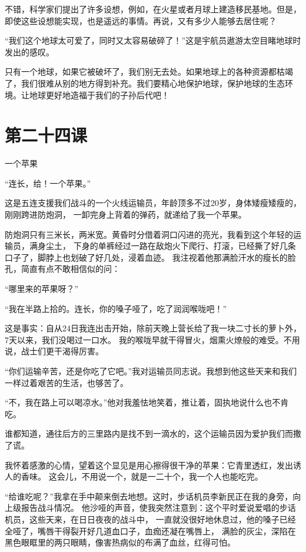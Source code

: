 \documentclass[12pt,UTF8]{ctexbook}
\begin{document}
不错，科学家们提出了许多设想，例如，在火星或者月球上建造移民基地。但是，即使这些设想能实现，也是遥远的事情。再说，又有多少人能够去居住呢？

“我们这个地球太可爱了，同时又太容易破碎了！”这是宇航员遨游太空目睹地球时发出的感叹。

只有一个地球，如果它被破坏了，我们别无去处。如果地球上的各种资源都枯竭了，我们很难从别的地方得到补充。我们要精心地保护地球，保护地球的生态环境。让地球更好地造福于我们的子孙后代吧！

\section{第二十四课}

一个苹果

“连长，给！一个苹果。”

这是五连支援我们战斗的一个火线运输员，年龄顶多不过20岁，身体矮瘦矮瘦的，刚刚跨进防炮洞，
一卸完身上背着的弹药，就递给了我一个苹果。

防炮洞只有三米长，两米宽。黄昏时分借着洞口闪进的亮光，我看到这个年轻的运输员，满身尘土，
下身的单裤经过一路在敌炮火下爬行、打滚，已经撕了好几条口子了，脚脖上也划破了好几处，浸着血迹。
我注视着他那满脸汗水的瘦长的脸孔，简直有点不敢相信似的问：

“哪里来的苹果呀？”

“我在半路上拾的。连长，你的嗓子哑了，吃了润润喉咙吧！”

这是事实：自从24日我连出击开始，除前天晚上营长给了我一块二寸长的萝卜外，7天以来，我们没喝过一口水。
我的喉咙早就干得冒火，烟熏火燎般的难受。不用说，战士们更干渴得厉害。

“你们运输辛苦，还是你吃了它吧。”我对运输员同志说。我想到他这些天来和我们一样过着艰苦的生活，也够苦了。

“不，我在路上可以喝凉水。”他对我羞怯地笑着，推让着，固执地说什么也不肯吃。

谁都知道，通往后方的三里路内是找不到一滴水的，这个运输员因为爱护我们而撒了谎。

我怀着感激的心情，望着这个显见是用心擦得很干净的苹果：它青里透红，发出诱人的香味。
这会儿，不用说一个，就是一二十个，我一个人也能吃完。

“给谁吃呢？”我拿在手中颠来倒去地想。这时，步话机员李新民正在我的身旁，向上级报告战斗情况。
他沙哑的声音，使我突然注意到：这个平时爱说爱唱的步话机员，这些天来，在日日夜夜的战斗中，
一直就没很好地休息过，他的嗓子已经全哑了，嘴唇干得裂开好几道血口子，血痂还凝在嘴唇上，
满脸的灰尘，深陷在黑色眼眶里的两只眼睛，像害热病似的布满了血丝，红得可怕。
\end{document}
